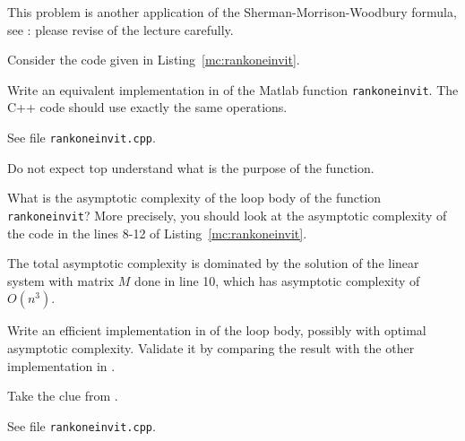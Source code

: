 \renewcommand{\chpt}{ch_directmethodslse \coreproblem}

\begin{problem} \label{prb:rankoneinvit}
This problem is another application of the Sherman-Morrison-Woodbury formula, see
: please revise  of the lecture carefully.

Consider the \matlab{} code given in Listing~\ref{mc:rankoneinvit}.


\begin{subproblem}[2]
    Write an equivalent implementation in \Eigen{} of the Matlab function \texttt{rankoneinvit}. The C++ code should use exactly the same operations.
  \begin{solution}
See file \texttt{rankoneinvit.cpp}.
    \end{solution}
 Do not expect top understand what is the purpose of the function.
\end{subproblem}

\begin{subproblem}[1]
  What is the asymptotic complexity of the loop body of the function
  \texttt{rankoneinvit}? More precisely, you should look at the asymptotic
  complexity of the code in the lines 8-12 of Listing~\ref{mc:rankoneinvit}.
\begin{solution}
The total asymptotic complexity is dominated by the solution of the linear system with matrix $M$ done in line 10, which has asymptotic complexity of $O(n^3)$.
\end{solution}
\end{subproblem}

\begin{subproblem}[3]
 Write an efficient implementation in \Eigen{} of the loop body, possibly with optimal asymptotic complexity. Validate it by comparing the result with the other implementation in \Eigen{}.

 \begin{hint}
   Take the clue from .
 \end{hint}

 \begin{solution}
   See file \texttt{rankoneinvit.cpp}.
 \end{solution}
 
\end{subproblem}


\end{problem}
